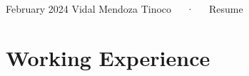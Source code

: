 \documentclass[11pt,a4paper,]{awesome-cv}
\begin{document}
\makecvheader

\makecvfooter
  {February 2024}
    { Vidal Mendoza Tinoco~~~·~~~Resume}
  {\thepage}





\hypertarget{working-experience}{%
\section{Working Experience}\label{working-experience}}
\end{document}
